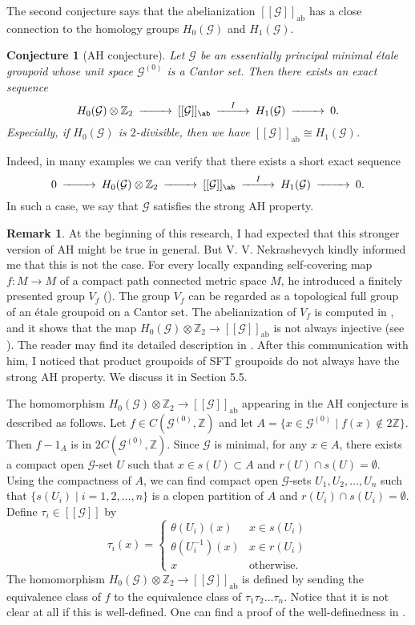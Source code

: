 \documentclass[11pt]{article}
\newtheorem{conjecture}[theorem]{Conjecture}
\theoremstyle{definition}
\newtheorem{remark}[theorem]{Remark}
\numberwithin{equation}{section}
\newcommand{\ab}{\mathrm{ab}}
\newcommand{\G}{\mathcal{G}}
\newcommand{\Z}{\mathbb{Z}}
\begin{document}
The second conjecture says that 
the abelianization $[[\G]]_\ab$ has a close connection 
to the homology groups $H_0(\G)$ and $H_1(\G)$. 

\begin{conjecture}[AH conjecture]\label{AH}
Let $\G$ be an essentially principal minimal \'etale groupoid 
whose unit space $\G^{(0)}$ is a Cantor set. 
Then there exists an exact sequence 
\[
\begin{CD}
H_0(\G)\otimes\Z_2@>>>[[\G]]_\ab@>I>>H_1(\G)@>>>0. 
\end{CD}
\]
Especially, if $H_0(\G)$ is $2$-divisible, 
then we have $[[\G]]_\ab\cong H_1(\G)$. 
\end{conjecture}

Indeed, in many examples we can verify that 
there exists a short exact sequence 
\[
\begin{CD}
0@>>>H_0(\G)\otimes\Z_2@>>>[[\G]]_\ab@>I>>H_1(\G)@>>>0. 
\end{CD}
\]
In such a case, 
we say that $\G$ satisfies the strong AH property. 

\begin{remark}
At the beginning of this research, 
I had expected that 
this stronger version of AH might be true in general. 
But V. V. Nekrashevych kindly informed me that 
this is not the case. 
For every locally expanding self-covering map $f:M\to M$ 
of a compact path connected metric space $M$, 
he introduced a finitely presented group $V_f$ (\cite{Ne13}). 
The group $V_f$ can be regarded 
as a topological full group of an \'etale groupoid on a Cantor set. 
The abelianization of $V_f$ is computed in \cite[Section 5.3]{Ne13}, 
and it shows that the map $H_0(\G)\otimes\Z_2\to[[\G]]_\ab$ is 
not always injective (see \cite[Proposition 5.8]{Ne13}). 
The reader may find its detailed description in \cite[Example 7.1]{Ne15}. 
After this communication with him, 
I noticed that 
product groupoids of SFT groupoids do not always have the strong AH property. 
We discuss it in Section 5.5. 
\end{remark}

The homomorphism $H_0(\G)\otimes\Z_2\to[[\G]]_\ab$ 
appearing in the AH conjecture is described as follows. 
Let $f\in C(\G^{(0)},\Z)$ and 
let $A=\{x\in\G^{(0)}\mid f(x)\notin2\Z\}$. 
Then $f-1_A$ is in $2C(\G^{(0)},\Z)$. 
Since $\G$ is minimal, for any $x\in A$, 
there exists a compact open $\G$-set $U$ 
such that $x\in s(U)\subset A$ and $r(U)\cap s(U)=\emptyset$. 
Using the compactness of $A$, 
we can find compact open $\G$-sets $U_1,U_2,\dots,U_n$ 
such that $\{s(U_i)\mid i=1,2,\dots,n\}$ is a clopen partition of $A$ 
and $r(U_i)\cap s(U_i)=\emptyset$. 
Define $\tau_i\in[[\G]]$ by 
\[
\tau_i(x)=\begin{cases}\theta(U_i)(x)&x\in s(U_i)\\
\theta(U_i^{-1})(x)&x\in r(U_i)\\x&\text{otherwise. }\end{cases}
\]
The homomorphism $H_0(\G)\otimes\Z_2\to[[\G]]_\ab$ is defined 
by sending the equivalence class of $f$ to 
the equivalence class of $\tau_1\tau_2\dots\tau_n$. 
Notice that it is not clear at all if this is well-defined. 
One can find a proof of the well-definedness in \cite{Ne15}. 
\end{document}

